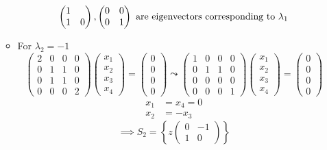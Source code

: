 \begin{enumerate}
\begin{itemize}
\begin{gather}
\begin{pmatrix}
    1\\1&0\end{pmatrix},\begin{pmatrix}0 & 0\\0 &
    1\end{pmatrix} \text{ are eigenvectors corresponding to } \lambda_1\notag
\end{gather}
\item For $\lambda_2 = -1$
\begin{equation}
\begin{pmatrix}
2 &  0 & 0 & 0\\
0 & 1 & 1 &0\\
0 & 1 & 1 &0\\
0 & 0 & 0 & 2
\end{pmatrix}
\begin{pmatrix}
x_1\\x_2\\x_3\\x_4
\end{pmatrix}
=\begin{pmatrix}
0\\0\\0\\0
\end{pmatrix}
\leadsto
\begin{pmatrix}
1 & 0 & 0 & 0\\
0 & 1 & 1 & 0\\
0 & 0 & 0 & 0\\
0 & 0 & 0 & 1
\end{pmatrix}
\begin{pmatrix}
x_1\\x_2\\x_3\\x_4
\end{pmatrix}
=\begin{pmatrix}
0\\0\\0\\0
\end{pmatrix}
\end{equation}
\begin{align}
x_1 &= x_4 =0 \\
x_2 &= -x_3
\end{align}
\begin{equation}
\implies S_2 = \left\{z\begin{pmatrix}0 & -1\\1 & 0\end{pmatrix}\right\}
\end{equation}

\end{itemize}
\end{enumerate}
